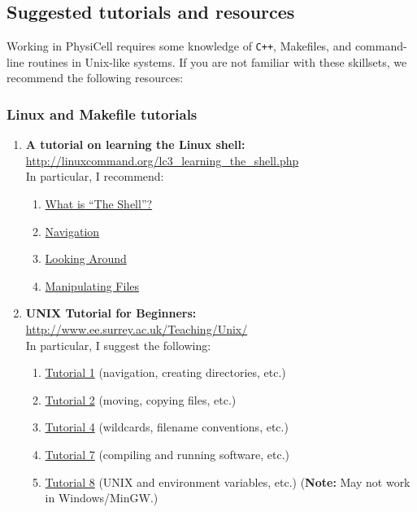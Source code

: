 \documentclass[12pt]{article}
\renewcommand{\v}{\verb}
\newcommand{\blue}[1]{\textcolor{blue}{#1}}
\newcommand{\DONE}{}%
\begin{document}
\subsection{Suggested tutorials and resources\DONE}
Working in PhysiCell requires some knowledge of \v|C++|, Makefiles, and command-line routines in Unix-like systems. 
If you are not familiar with these skillsets, we recommend the following resources:

\subsubsection{Linux and Makefile tutorials}
\begin{enumerate}
\item 
\textbf{A tutorial on learning the Linux shell:} \href{http://linuxcommand.org/lc3_learning_the_shell.php}{http://linuxcommand.org/lc3\_learning\_the\_shell.php} \\
In particular, I recommend: 
\begin{enumerate}
\item \href{http://linuxcommand.org/lc3_lts0010.php}{What is ``The Shell''?} 
\item \href{http://linuxcommand.org/lc3_lts0020.php}{Navigation}
\item \href{http://linuxcommand.org/lc3_lts0030.php}{Looking Around}
\item \href{http://linuxcommand.org/lc3_lts0050.php}{Manipulating Files}
\end{enumerate}

\item \textbf{UNIX Tutorial for Beginners: } \href{http://www.ee.surrey.ac.uk/Teaching/Unix/}{http://www.ee.surrey.ac.uk/Teaching/Unix/} \\
In particular, I suggest the following: 
\begin{enumerate}
\item \href{http://www.ee.surrey.ac.uk/Teaching/Unix/unix1.html}{Tutorial 1} (navigation, creating directories, etc.) 
\item \href{http://www.ee.surrey.ac.uk/Teaching/Unix/unix2.html}{Tutorial 2} (moving, copying files, etc.)
\item \href{http://www.ee.surrey.ac.uk/Teaching/Unix/unix4.html}{Tutorial 4} (wildcards, filename conventions, etc.)
\item \href{http://www.ee.surrey.ac.uk/Teaching/Unix/unix7.html}{Tutorial 7} (compiling and running software, etc.)
\item \href{http://www.ee.surrey.ac.uk/Teaching/Unix/unix8.html}{Tutorial 8} (UNIX and environment variables, etc.) (\textbf{Note:} 
May not work in Windows/MinGW.) 
\end{enumerate}


\end{enumerate}
\end{document}
